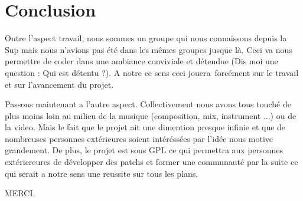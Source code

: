 \documentclass[14pt,a4paper]{article}
\begin{document}
\newpage
\section{Conclusion}

Outre l'aspect travail, nous sommes un groupe qui nous connaissons depuis
 la Sup mais nous n'avions pas \'et\'e dans les m\^emes groupes jusque l\`a.
 Ceci va nous permettre de coder dans une ambiance conviviale et d\'etendue
 (Dis moi une question : Qui est d\'etentu ?). A notre ce sens ceci jouera\
 forc\'ement sur le travail et sur l'avancement du projet.\\
\par
Passons maintenant a l'autre aspect. Collectivement nous avons tous touch\'e
 de plus moins loin au milieu de la musique (composition, mix, instrument ...)
 ou de la video. Mais le fait que le projet ait une dimention presque
 infinie et que de nombreuses personnes ext\'erieures soient
 int\'er\'ess\'ees par l'id\'ee nous motive grandement. De plus, le projet
 est sous GPL ce qui permettra aux personnes ext\'eriereures de
 d\'evelopper des patchs et former une communaut\'e par la suite ce qui
 serait a notre sens une reussite sur tous les plans.\\

\newpage

\begin{center}
MERCI.
\end{center}
\end{document}
